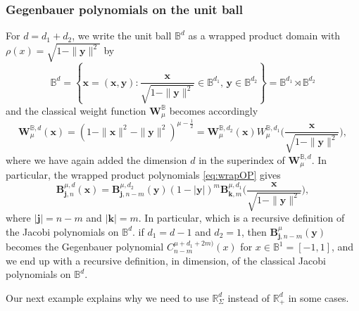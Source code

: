 \documentclass{amsart}
\theoremstyle{remark}
\def\jb{{\bm j}}
\def\kb{{\bm k}}
\def\xb{{\bm x}}
\def\yb{{\bm y}}
\def\Bb{{\bm B}}
\def\Wb{{\bm W}}
\def\BB{{\mathbb B}}
\def\RR{{\mathbb R}}
\def\f{\frac}
\begin{document}
\subsubsection{Gegenbauer polynomials on the unit ball} For $d = d_1 + d_2$, we write the unit ball 
$\BB^d$ as a wrapped product domain with $\rho(x) = \sqrt{1-\|\yb\|^2}$ by 
$$
  \BB^d = \left \{\xb = (\xb,\yb): \frac{\xb}{\sqrt{1-\|\yb\|^2}} \in \BB^{d_1},\, \yb \in \BB^{d_2} \right\} = \BB^{d_1} \rtimes \BB^{d_2} 
$$
and the classical weight function $\Wb^\BB_\mu$ becomes accordingly
$$
   \Wb^{\BB,d}_\mu(\xb) = (1-\|\xb\|^2-\|\yb\|^2)^{\mu-\f12} 
        = \Wb^{\BB, d_2}_\mu (\xb) W_{\mu}^{\BB, d_1} \bigg(\frac{\xb}{\sqrt{1-\|\yb\|^2}} \bigg),
$$
where we have again added the dimension $d$ in the superindex of $\Wb_{\mu}^{\BB, d}$. In particular, 
the wrapped product polynomials \eqref{eq:wrapOP} gives 
$$
  \Bb_{\jb, n}^{\mu,d} (\xb) = \Bb_{\jb, n-m}^{\mu, d_2}(\yb) (1-|\yb|)^m \Bb_{\kb,m}^{\mu,d_1} \bigg(\frac{\xb}{\sqrt{1-\|\yb\|^2}}\bigg), 
$$
where $|\jb|= n-m$ and $|\kb|= m$. In particular, 
which is a recursive definition of the Jacobi polynomials on $\BB^d$.  if $d_1 = d-1$ and $d_2 = 1$, then 
$\Bb_{\jb, n-m}^{\mu}(\yb)$ becomes the Gegenbauer polynomial $C_{n-m}^{\mu+d_1+2m)}(x)$ for 
$x \in \BB^1 = [-1,1]$, and we end up with a recursive definition, in dimension, of the classical Jacobi polynomials
on $\BB^d$.

\medskip

Our next example explains why we need to use $\RR_\Sigma^d$ instead of $\RR_+^d$ in some cases. 
\end{document}
